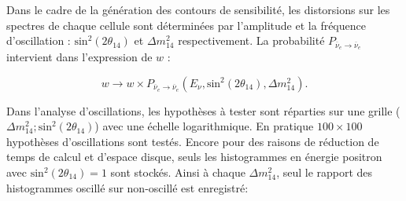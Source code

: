 
Dans le cadre de la génération des contours de sensibilité, les distorsions sur les spectres de chaque cellule sont déterminées par l'amplitude et la fréquence d'oscillation : $\textrm{sin}^2(2\theta_{14})$ et $\Delta m_{14}^2$ respectivement. La probabilité $P_{\overline{\nu}_e \rightarrow \overline{\nu}_e}$ intervient dans l'expression de $w$ :

\begin{equation}
    w \rightarrow w \times P_{\overline{\nu}_e \rightarrow \overline{\nu}_e} (E_\nu, \textrm{sin}^2(2\theta_{14}), \Delta m_{14}^2).
\end{equation}

\bigbreak

Dans l'analyse d'oscillations, les hypothèses à tester sont réparties sur une grille ($\Delta m_{14}^2; \textrm{sin}^2(2\theta_{14})$) avec une échelle logarithmique. En pratique $100 \times 100$ hypothèses d'oscillations sont testés. Encore pour des raisons de réduction de temps de calcul et d'espace disque, seuls les histogrammes en énergie positron avec $\textrm{sin}^2(2\theta_{14}) = 1$ sont stockés. Ainsi à chaque $\Delta m_{14}^2$, seul le rapport des histogrammes oscillé sur non-oscillé est enregistré:

